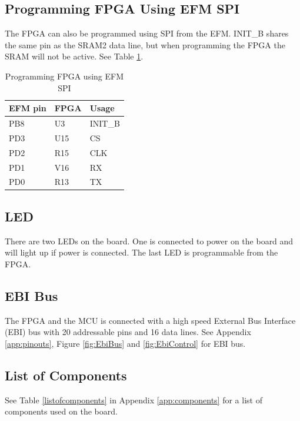 \subsection{Programming FPGA Using EFM SPI}
The FPGA can also be programmed using SPI from the EFM.
INIT\_B shares the same pin as the SRAM2 data line, but when programming the FPGA the SRAM will not be active.
See Table \ref{tab:SpiProgrammer}.

\begin{table}[]
    \centering
    \begin{tabular}{lll}
        EFM pin & FPGA & Usage   \\
        \hline
        PB8     & U3   & INIT\_B \\
        PD3     & U15  & CS      \\
        PD2     & R15  & CLK     \\
        PD1     & V16  & RX      \\
        PD0     & R13  & TX
    \end{tabular}
    \caption{Programming FPGA using EFM SPI}
    \label{tab:SpiProgrammer}
\end{table}

\subsection{LED}
There are two LEDs on the board.
One is connected to power on the board and will light up if power is connected.
The last LED is programmable from the FPGA.

\subsection{EBI Bus}
The FPGA and the MCU is connected with a high speed External Bus Interface (EBI) bus with 20 addressable pins and 16 data lines.
See Appendix \ref{app:pinouts}, Figure \ref{fig:EbiBus} and \ref{fig:EbiControl} for EBI bus.

\subsection{List of Components}
See Table \ref{listofcomponents} in Appendix \ref{app:components} for a list of components used on the board.


